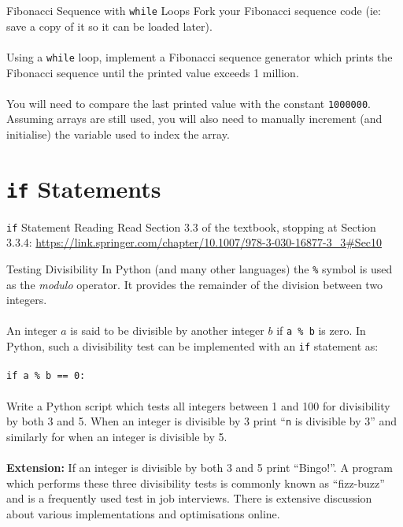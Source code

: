 \documentclass{lab}
\begin{document}
\begin{task}{Fibonacci Sequence with \texttt{while} Loops}{}
Fork your Fibonacci sequence code (ie: save a copy of it so it can be loaded later).
\\~\\
Using a \texttt{while} loop, implement a Fibonacci sequence generator which prints the Fibonacci sequence until the printed value exceeds 1 million.
\\~\\
You will need to compare the last printed value with the constant \texttt{1000000}. Assuming arrays are still used, you will also need to manually increment (and initialise) the variable used to index the array.
\end{task}

\section{\texttt{if} Statements}

\begin{task}{\texttt{if} Statement Reading}{}
Read Section 3.3 of the textbook, stopping at Section 3.3.4: \url{https://link.springer.com/chapter/10.1007/978-3-030-16877-3_3#Sec10} 
\end{task}

\begin{task}{Testing Divisibility}{}
In Python (and many other languages) the \texttt{\%} symbol is used as the \textit{modulo} operator. It provides the remainder of the division between two integers.
\\~\\
An integer $a$ is said to be divisible by another integer $b$ if \texttt{a \% b} is zero. In Python, such a divisibility test can be implemented with an \texttt{if} statement as:
\\~\\
\texttt{if a \% b == 0:}
\\~\\
Write a Python script which tests all integers between 1 and 100 for divisibility by both 3 and 5. When an integer is divisible by 3 print ``\texttt{n} is divisible by 3'' and similarly for when an integer is divisible by 5.
\\~\\
\textbf{Extension:} If an integer is divisible by both 3 and 5 print ``Bingo!''. A program which performs these three divisibility tests is commonly known as ``fizz-buzz'' and is a frequently used test in job interviews. There is extensive discussion about various implementations and optimisations online.
\end{task}
\end{document}
